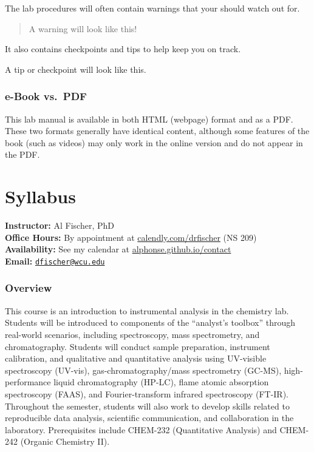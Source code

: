 \documentclass[]{tufte-book}
\begin{document}
The lab procedures will often contain warnings that your should watch out for.

\begin{quote}
A warning will look like this!
\end{quote}

It also contains checkpoints and tips to help keep you on track.\\

\begin{marginfigure}
A tip or checkpoint will look like this.
\end{marginfigure}

\hypertarget{e-book-vs.-pdf}{%
\subsection*{\texorpdfstring{\textbf{e-Book vs.~PDF}}{e-Book vs.~PDF}}\label{e-book-vs.-pdf}}

This lab manual is available in both HTML (webpage) format and as a PDF. These two formats generally have identical content, although some features of the book (such as videos) may only work in the online version and do not appear in the PDF.

\hypertarget{syllabus}{%
\chapter*{Syllabus}\label{syllabus}}

\textbf{Instructor:} Al Fischer, PhD\\
\textbf{Office Hours:} By appointment at \href{http://www.calendly.com/drfischer}{calendly.com/drfischer} (NS 209)\\
\textbf{Availability:} See my calendar at \href{\%7B\%7Bsite.baseurl\%7D\%7D/contact}{alphonse.github.io/contact}\\
\textbf{Email:} \href{mailto:dfischer@wcu.edu}{\nolinkurl{dfischer@wcu.edu}}

\hypertarget{overview-1}{%
\subsection*{Overview}\label{overview-1}}

This course is an introduction to instrumental analysis in the chemistry lab. Students will be introduced to components of the ``analyst's toolbox'' through real-world scenarios, including spectroscopy, mass spectrometry, and chromatography. Students will conduct sample preparation, instrument calibration, and qualitative and quantitative analysis using UV-visible spectroscopy (UV-vis), gas-chromatography/mass spectrometry (GC-MS), high-performance liquid chromatography (HP-LC), flame atomic absorption spectroscopy (FAAS), and Fourier-transform infrared spectroscopy (FT-IR). Throughout the semester, students will also work to develop skills related to reproducible data analysis, scientific communication, and collaboration in the laboratory. Prerequisites include CHEM-232 (Quantitative Analysis) and CHEM-242 (Organic Chemistry II).
\end{document}
